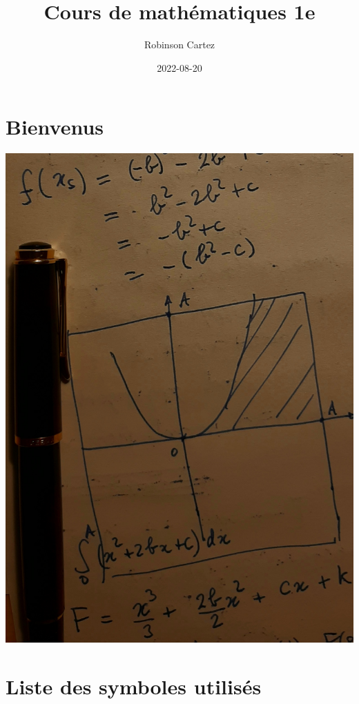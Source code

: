 \documentclass[
  12pt,
]{book}
\title{Cours de mathématiques 1e}
\author{Robinson Cartez}
\date{2022-08-20}
\begin{document}
\maketitle

{
\setcounter{tocdepth}{1}
\tableofcontents
}
\hypertarget{bienvenus}{%
\chapter*{Bienvenus}\label{bienvenus}}

\begin{cadre}
\includegraphics{images/cover_cours1e.jpg}

\end{cadre}

\hypertarget{liste-des-symboles-utilisuxe9s}{%
\chapter*{Liste des symboles utilisés}\label{liste-des-symboles-utilisuxe9s}}
\end{document}
